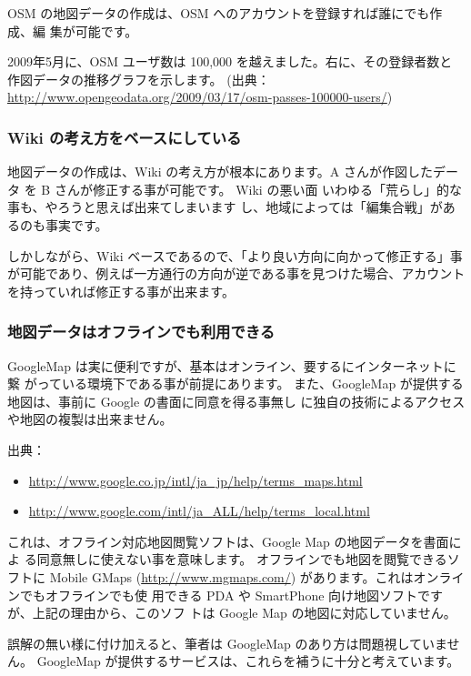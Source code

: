 \documentclass[mingoth,a4paper]{jsarticle}
\begin{document}
OSM の地図データの作成は、OSM へのアカウントを登録すれば誰にでも作成、編
集が可能です。

2009年5月に、OSM ユーザ数は 100,000 を越えました。右に、その登録者数と
作図データの推移グラフを示します。
(出典：\url{http://www.opengeodata.org/2009/03/17/osm-passes-100000-users/})

\clearpage

\subsubsection{Wiki の考え方をベースにしている}

地図データの作成は、Wiki の考え方が根本にあります。A さんが作図したデータ
を B さんが修正する事が可能です。
Wiki の悪い面 いわゆる「荒らし」的な事も、やろうと思えば出来てしまいます
し、地域によっては「編集合戦」があるのも事実です。

しかしながら、Wiki ベースであるので、「より良い方向に向かって修正する」事
が可能であり、例えば一方通行の方向が逆である事を見つけた場合、アカウント
を持っていれば修正する事が出来ます。

\subsubsection{地図データはオフラインでも利用できる}

GoogleMap は実に便利ですが、基本はオンライン、要するにインターネットに繋
がっている環境下である事が前提にあります。
また、GoogleMap が提供する地図は、事前に Google の書面に同意を得る事無し
に独自の技術によるアクセスや地図の複製は出来ません。

出典：
\begin{itemize}
 \item \url{http://www.google.co.jp/intl/ja_jp/help/terms_maps.html}
 \item \url{http://www.google.com/intl/ja_ALL/help/terms_local.html}
\end{itemize}

これは、オフライン対応地図閲覧ソフトは、Google Map の地図データを書面によ
る同意無しに使えない事を意味します。
オフラインでも地図を閲覧できるソフトに Mobile GMaps
(\url{http://www.mgmaps.com/}) があります。これはオンラインでもオフラインでも使
用できる PDA や SmartPhone 向け地図ソフトですが、上記の理由から、このソフ
トは Google Map の地図に対応していません。

誤解の無い様に付け加えると、筆者は GoogleMap のあり方は問題視していません。
GoogleMap が提供するサービスは、これらを補うに十分と考えています。
\end{document}
